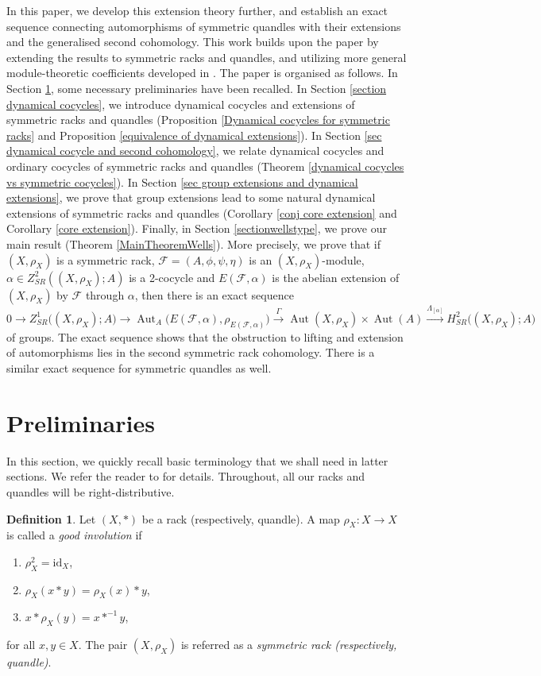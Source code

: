 \documentclass[11pt,reqno]{amsart}
\theoremstyle{definition}
\newtheorem{definition}[theorem]{Definition}
\numberwithin{equation}{subsection}
\newcommand{\id}{\mathrm{id}}
\begin{document}
In this paper, we develop this extension theory further, and establish an exact sequence connecting automorphisms of symmetric quandles with their extensions and the generalised second cohomology. This work builds upon the paper \cite{MR4282648} by extending the results to symmetric racks and quandles, and utilizing more general module-theoretic coefficients developed in \cite{KSS2024}. The paper is organised as follows. In Section \ref{sectionpreliminaries}, some necessary preliminaries have been recalled. In Section \ref{section dynamical cocycles}, we introduce dynamical cocycles and extensions of symmetric racks and quandles (Proposition \ref{Dynamical cocycles for symmetric racks} and Proposition \ref{equivalence of dynamical extensions}). In Section \ref{sec dynamical cocycle and second cohomology}, we relate dynamical cocycles and ordinary cocycles of symmetric racks and quandles (Theorem \ref{dynamical cocycles vs symmetric cocycles}). In Section \ref{sec group extensions and dynamical extensions}, we prove that group extensions lead to some natural dynamical extensions of symmetric racks and quandles (Corollary \ref{conj core extension} and Corollary \ref{core extension}).  Finally, in Section \ref{sectionwellstype}, we prove our main result (Theorem \ref{MainTheoremWells}). More precisely, we prove that if $(X, \rho_X)$ is a symmetric rack,  $\mathcal{F}=(A, \phi, \psi, \eta)$ is an $(X, \rho_{X})$-module, $\alpha \in Z_{S R}^2((X, \rho_X); A)$ is a 2-cocycle and $E(\mathcal{F}, \alpha)$ is the abelian extension of $(X, \rho_X)$ by $\mathcal{F}$ through $\alpha$, then there is an exact sequence 
$$
0\to Z_{SR}^{1} \big((X, \rho_{X});A \big) \to \operatorname{Aut}_{A} \big(E(\mathcal{F}, \alpha), \rho_{E(\mathcal{F}, \alpha)} \big) \stackrel{\Gamma}{\to} \operatorname{Aut} (X, \rho_{X})\times\operatorname{Aut}(A) \stackrel{\Lambda_{[\alpha]}}{\to}H_{SR}^{2} \big((X,\rho_{X});A \big) 
$$
of groups. The exact sequence shows that the obstruction to lifting and extension of automorphisms lies in  the second symmetric rack cohomology. There is a similar exact sequence for symmetric quandles as well.
\medskip


\section{Preliminaries} \label{sectionpreliminaries}
In this section, we quickly recall basic terminology that we shall need in latter sections. We refer the reader to \cite{KSS2024} for details. Throughout, all our racks and quandles will be right-distributive.
	\begin{definition}
		Let $(X,*)$ be a rack (respectively, quandle). A map $\rho_X:X \rightarrow X$ is called a \textit{good involution} if 
		\begin{enumerate}
			\item[(S1)] $\rho_X^2=\id_X$,
			\item[(S2)] $\rho_X(x \ast y)= \rho_X(x) \ast y$,
			\item[(S3)] $x \ast \rho_X(y) = x \ast^{-1}y$,
		\end{enumerate}
		for all $x, y \in X$.  The pair $(X, \rho_X)$ is referred as a \textit{symmetric rack (respectively, quandle)}.
	\end{definition}
\end{document}
